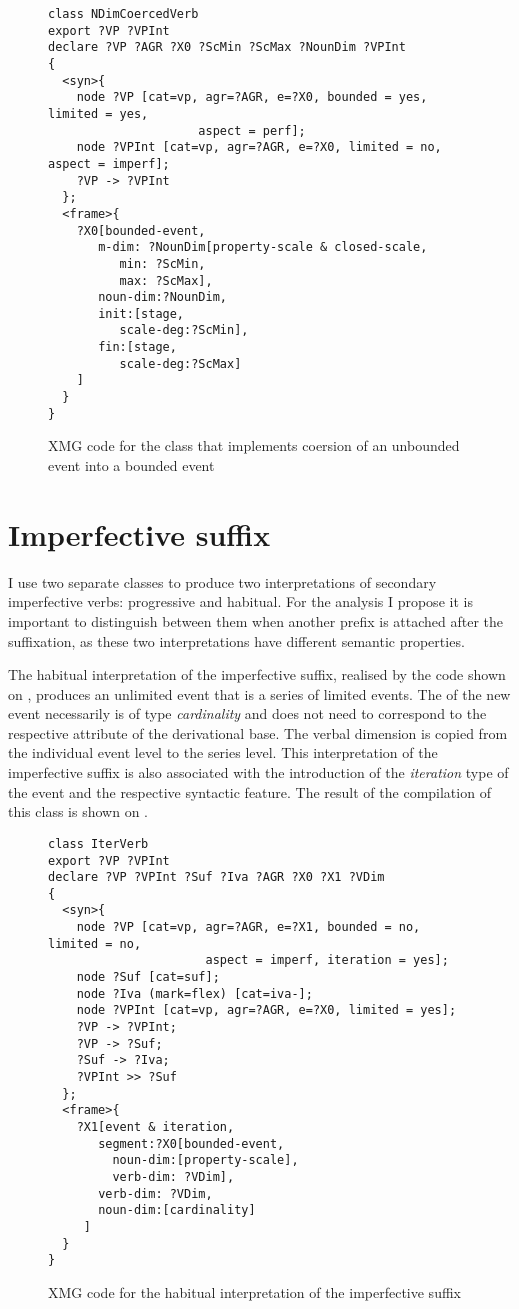\begin{figure}
\begin{verbatim}
class NDimCoercedVerb
export ?VP ?VPInt
declare ?VP ?AGR ?X0 ?ScMin ?ScMax ?NounDim ?VPInt
{
  <syn>{
    node ?VP [cat=vp, agr=?AGR, e=?X0, bounded = yes, limited = yes, 
    				 aspect = perf];
    node ?VPInt [cat=vp, agr=?AGR, e=?X0, limited = no, aspect = imperf];
    ?VP -> ?VPInt
  };
  <frame>{
    ?X0[bounded-event,
       m-dim: ?NounDim[property-scale & closed-scale,
          min: ?ScMin,
          max: ?ScMax],
       noun-dim:?NounDim,
       init:[stage, 
          scale-deg:?ScMin],
       fin:[stage, 
          scale-deg:?ScMax]
    ]
  }
}
\end{verbatim}
\caption{XMG code for the class that implements coersion of an unbounded event into a bounded event\label{xmg:coersion}}
\end{figure}

\section{Imperfective suffix}
I use two separate classes to produce two interpretations of secondary imperfective verbs: progressive and habitual. For the analysis I propose it is important to distinguish between them when another prefix is attached after the suffixation, as these two interpretations have different semantic properties.

The habitual interpretation of the imperfective suffix, realised by the code shown on , produces an unlimited event that is a series of limited events. The \NOUNDIM of the new event necessarily is of type \textit{cardinality} and does not need to correspond to the respective attribute of the derivational base. The verbal dimension is copied from the individual event level to the series level. This interpretation of the imperfective suffix is also associated with the introduction of the \textit{iteration} type of the event and the respective syntactic feature. The result of the compilation of this class is shown on .

\begin{figure}
\begin{verbatim}
class IterVerb
export ?VP ?VPInt
declare ?VP ?VPInt ?Suf ?Iva ?AGR ?X0 ?X1 ?VDim
{
  <syn>{
    node ?VP [cat=vp, agr=?AGR, e=?X1, bounded = no, limited = no, 
    				  aspect = imperf, iteration = yes];
    node ?Suf [cat=suf];
    node ?Iva (mark=flex) [cat=iva-];
    node ?VPInt [cat=vp, agr=?AGR, e=?X0, limited = yes];
    ?VP -> ?VPInt;
    ?VP -> ?Suf;
    ?Suf -> ?Iva;
    ?VPInt >> ?Suf
  };
  <frame>{
    ?X1[event & iteration,
       segment:?X0[bounded-event,
         noun-dim:[property-scale],
         verb-dim: ?VDim],
       verb-dim: ?VDim,
       noun-dim:[cardinality] 
     ]
  }
}
\end{verbatim}
\caption{XMG code for the habitual interpretation of the imperfective suffix \label{xmg:habitual}}
\end{figure}

